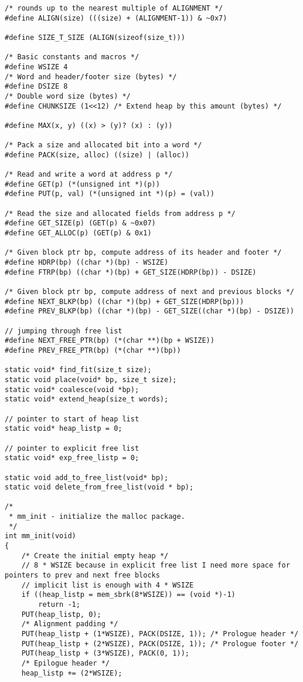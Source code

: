 \documentclass[a4paper]{article}
\begin{document}
\newpage

\begin{lstlisting}
/* rounds up to the nearest multiple of ALIGNMENT */
#define ALIGN(size) (((size) + (ALIGNMENT-1)) & ~0x7)

#define SIZE_T_SIZE (ALIGN(sizeof(size_t)))

/* Basic constants and macros */
#define WSIZE 4
/* Word and header/footer size (bytes) */
#define DSIZE 8
/* Double word size (bytes) */
#define CHUNKSIZE (1<<12) /* Extend heap by this amount (bytes) */

#define MAX(x, y) ((x) > (y)? (x) : (y))

/* Pack a size and allocated bit into a word */
#define PACK(size, alloc) ((size) | (alloc))

/* Read and write a word at address p */
#define GET(p) (*(unsigned int *)(p))
#define PUT(p, val) (*(unsigned int *)(p) = (val))

/* Read the size and allocated fields from address p */
#define GET_SIZE(p) (GET(p) & ~0x07)
#define GET_ALLOC(p) (GET(p) & 0x1)

/* Given block ptr bp, compute address of its header and footer */
#define HDRP(bp) ((char *)(bp) - WSIZE)
#define FTRP(bp) ((char *)(bp) + GET_SIZE(HDRP(bp)) - DSIZE)

/* Given block ptr bp, compute address of next and previous blocks */
#define NEXT_BLKP(bp) ((char *)(bp) + GET_SIZE(HDRP(bp)))
#define PREV_BLKP(bp) ((char *)(bp) - GET_SIZE((char *)(bp) - DSIZE))

// jumping through free list
#define NEXT_FREE_PTR(bp) (*(char **)(bp + WSIZE))
#define PREV_FREE_PTR(bp) (*(char **)(bp))

static void* find_fit(size_t size);
static void place(void* bp, size_t size);
static void* coalesce(void *bp);
static void* extend_heap(size_t words);

// pointer to start of heap list
static void* heap_listp = 0;

// pointer to explicit free list
static void* exp_free_listp = 0;

static void add_to_free_list(void* bp);
static void delete_from_free_list(void * bp);

/*
 * mm_init - initialize the malloc package.
 */
int mm_init(void)
{
	/* Create the initial empty heap */
	// 8 * WSIZE because in explicit free list I need more space for pointers to prev and next free blocks
	// implicit list is enough with 4 * WSIZE
	if ((heap_listp = mem_sbrk(8*WSIZE)) == (void *)-1)
		return -1;
	PUT(heap_listp, 0);
	/* Alignment padding */
	PUT(heap_listp + (1*WSIZE), PACK(DSIZE, 1)); /* Prologue header */
	PUT(heap_listp + (2*WSIZE), PACK(DSIZE, 1)); /* Prologue footer */
	PUT(heap_listp + (3*WSIZE), PACK(0, 1));
	/* Epilogue header */
	heap_listp += (2*WSIZE);


\end{lstlisting}
\end{document}
